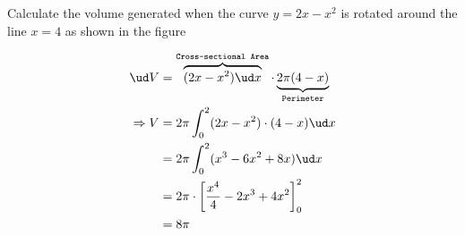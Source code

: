     \question[5] Calculate the volume generated when the curve 
    $y=2x-x^2$ is rotated around the line $x=4$ as shown in the 
    figure
      \begin{marginfigure}[1cm]
       \end{marginfigure} 
       
       \begin{solution}[\halfpage]
         \begin{align}
             \ud V &= \overbrace{(2x-x^2)\ud x}^{\texttt{Cross-sectional Area}}\cdot 
             \underbrace{2\pi (4-x)}_{\texttt{Perimeter}} \\ 
              \Rightarrow V &= 2\pi\int_0^2(2x-x^2)\cdot(4-x)\ud x \\
              &= 2\pi\int_0^2 (x^3-6x^2+8x)\ud x \\
              &= 2\pi\cdot\left[ \frac{x^4}{4}-2x^3+4x^2\right]_{0}^{2} \\ &= 8\pi
         \end{align} 
       \end{solution} 
